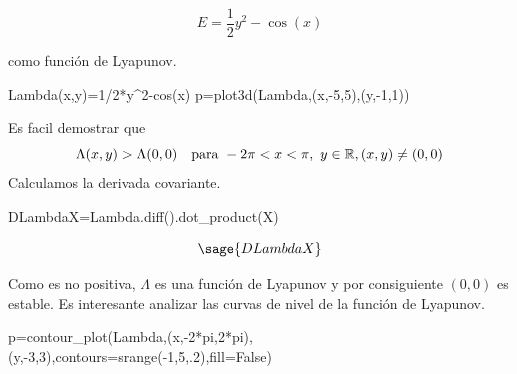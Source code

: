 \[E=\frac{1}{2}y^2-\cos(x)\]

como función de Lyapunov.
\begin{sageblock}
Lambda(x,y)=1/2*y^2-cos(x)
p=plot3d(Lambda,(x,-5,5),(y,-1,1))
\end{sageblock}
\begin{center}
\end{center}
Es facil demostrar que 
\[\Lambda(x,y)>\Lambda(0,0)\quad\hbox{para } -2\pi<x<\pi,\,\, y\in\mathbb{R},(x,y)\neq(0,0)\]
Calculamos la derivada covariante.

\begin{sageblock}
DLambdaX=Lambda.diff().dot_product(X)
\end{sageblock}

\[\sage{DLambdaX}\]

Como es no positiva, $\Lambda$ es una función de Lyapunov y por consiguiente $(0,0)$ es estable. Es interesante analizar las curvas de nivel de la función de Lyapunov.
\begin{sageblock}
p=contour_plot(Lambda,(x,-2*pi,2*pi),(y,-3,3),contours=srange(-1,5,.2),fill=False)
\end{sageblock}

\begin{center}
\end{center}

